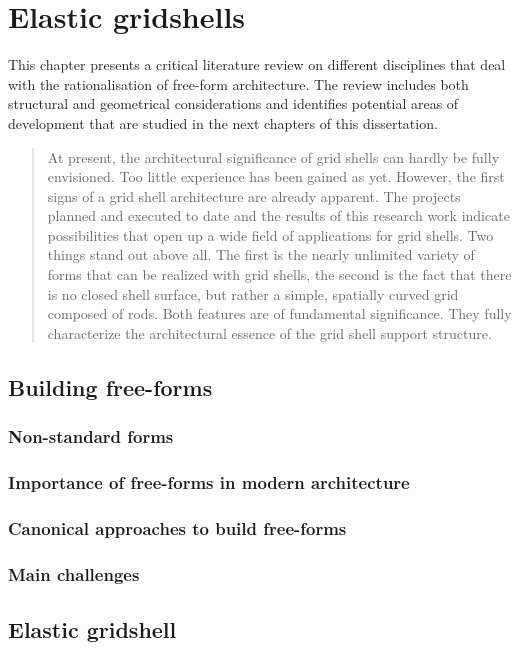 
\chapter{Elastic gridshells}

This chapter presents a critical literature review on different disciplines that deal with the rationalisation of free-form architecture. The review includes both structural and geometrical considerations and identifies potential areas of development that are studied in the next chapters of this dissertation.


\blockcquote[][p.~250]{IL10}{At present, the architectural significance of grid shells can hardly be fully envisioned. Too little experience has been gained as yet. However, the first signs of a grid shell architecture are already apparent. The projects planned and executed to date and the results of this research work indicate possibilities that open up a wide field of applications for grid shells. Two things stand out above all. The first is the nearly unlimited variety of forms that can be realized with grid shells, the second is the fact that there is no closed shell surface, but rather a simple, spatially curved grid composed of rods. Both features are of fundamental significance. They fully characterize the architectural essence of the grid shell support structure.}

\section{Building free-forms}
\subsection{Non-standard forms}
\subsection{Importance of free-forms in modern architecture}
\subsection{Canonical approaches to build free-forms}
\subsection{Main challenges}

\section{Elastic gridshell}

